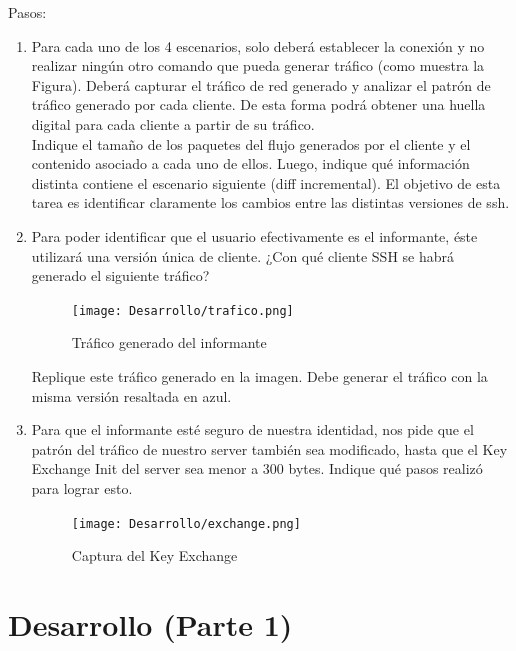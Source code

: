 \documentclass[letter,12pt]{article}
\begin{document}
Pasos:

\begin{enumerate}
\item Para cada uno de los 4 escenarios, solo deberá establecer la conexión y no realizar ningún otro comando que pueda generar tráfico (como muestra la Figura). Deberá capturar el tráfico de red generado y analizar el patrón de tráfico generado por cada cliente. De esta forma podrá obtener una huella digital para cada cliente a partir de su tráfico.\\

Indique el tamaño de los paquetes del flujo generados por el cliente y el contenido asociado a cada uno de ellos. Luego, indique qué información distinta contiene el escenario siguiente (diff incremental). El objetivo de esta tarea es identificar claramente los cambios entre las distintas versiones de ssh.

\newpage

\item Para poder identificar que el usuario efectivamente es el informante, éste utilizará una versión única de cliente. ¿Con qué cliente SSH se habrá generado el siguiente tráfico?

\begin{figure}[H]
    \centering
    \texttt{[image: Desarrollo/trafico.png]}
    \caption{Tráfico generado del informante}
    \label{fig:ASCII}
\end{figure}

Replique este tráfico generado en la imagen. Debe generar el tráfico con la misma versión resaltada en azul.

\newpage

\item Para que el informante esté seguro de nuestra identidad, nos pide que el patrón del tráfico de nuestro server también sea modificado, hasta que el Key Exchange Init del server sea menor a 300 bytes. Indique qué pasos realizó para lograr esto.

\begin{figure}[H]
    \centering
    \texttt{[image: Desarrollo/exchange.png]}
    \caption{Captura del Key Exchange}
    \label{fig:ASCII}
\end{figure}

\end{enumerate}


\section{Desarrollo (Parte 1)}
\end{document}
